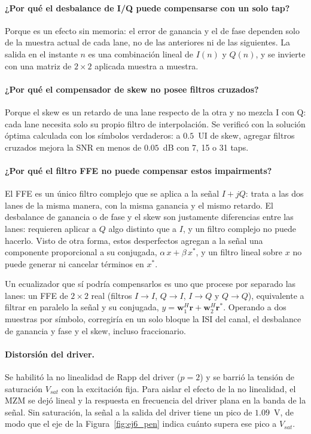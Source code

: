 \paragraph{¿Por qué el desbalance de I/Q puede compensarse con un solo tap?}
Porque es un efecto sin memoria: el error de ganancia y el de fase
dependen solo de la muestra actual de cada lane, no de las anteriores ni
de las siguientes. La salida en el instante $n$ es una combinación lineal
de $I(n)$ y $Q(n)$, y se invierte con una matriz de $2\times2$ aplicada
muestra a muestra.

\paragraph{¿Por qué el compensador de skew no posee filtros cruzados?}
Porque el skew es un retardo de una lane respecto de la otra y no mezcla
I con Q: cada lane necesita solo su propio filtro de interpolación. Se
verificó con la solución óptima calculada con los símbolos verdaderos: a
$0.5$~UI de skew, agregar filtros cruzados mejora la SNR en menos de
$0.05$~dB con 7, 15 o 31 taps.

\paragraph{¿Por qué el filtro FFE no puede compensar estos impairments?}
El FFE es un único filtro complejo que se aplica a la señal $I + jQ$:
trata a las dos lanes de la misma manera, con la misma ganancia y el
mismo retardo. El desbalance de ganancia o de fase y el skew son
justamente diferencias entre las lanes: requieren aplicar a $Q$ algo
distinto que a $I$, y un filtro complejo no puede hacerlo. Visto de otra
forma, estos desperfectos agregan a la señal una componente proporcional
a su conjugada, $\alpha\,x + \beta\,x^*$, y un filtro lineal sobre $x$ no
puede generar ni cancelar términos en $x^*$.

Un ecualizador que sí podría compensarlos es uno que procese por separado
las lanes: un FFE de $2\times2$ real (filtros $I\!\rightarrow\!I$,
$Q\!\rightarrow\!I$, $I\!\rightarrow\!Q$ y $Q\!\rightarrow\!Q$),
equivalente a filtrar en paralelo la señal y su conjugada,
$y = \mathbf{w}_1^H \mathbf{r} + \mathbf{w}_2^H \mathbf{r}^*$. Operando a
dos muestras por símbolo, corregiría en un solo bloque la ISI del canal,
el desbalance de ganancia y fase y el skew, incluso fraccionario.

\paragraph{Distorsión del driver.}
Se habilitó la no linealidad de Rapp del driver ($p = 2$) y se barrió la
tensión de saturación $V_{sat}$ con la excitación fija. Para aislar el
efecto de la no linealidad, el MZM se dejó lineal y la respuesta en
frecuencia del driver plana en la banda de la señal. Sin saturación, la
señal a la salida del driver tiene un pico de $1.09$~V, de modo que el eje
de la Figura~\ref{fig:ej6_pen} indica cuánto supera ese pico a $V_{sat}$.

